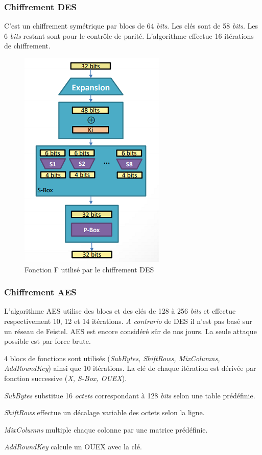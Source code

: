 \documentclass[12pt, a4paper]{article}
\begin{document}
	\subsubsection{Chiffrement DES}
	C'est un chiffrement symétrique par blocs de 64 \textit{bits}. Les clés sont
	de 58 \textit{bits}. Les 6 \textit{bits} restant sont pour le contrôle de
	parité. L'algorithme effectue 16 itérations de chiffrement.
	\begin{figure}[!ht]
		\centering
		\includegraphics{images/des}
		\caption{Fonction F utilisé par le chiffrement DES}
		\label{fig:des}
	\end{figure}
	\subsubsection{Chiffrement AES}
	L'algorithme AES utilise des blocs et des clés de 128 à 256 \textit{bits} et
	effectue respectivement 10, 12 et 14 itérations. \textit{A contrario} de DES
	il n'est pas basé sur un réseau de Feistel. AES est encore considéré sûr de
	nos jours. La seule attaque possible est par force brute.
	\par
	4 blocs de fonctions sont utilisés (\textit{SubBytes, ShiftRows, MixColumns,
	AddRoundKey}) ainsi que 10 itérations. La clé de chaque itération est dérivée
	par fonction successive (\textit{X, S-Box, OUEX}).
	\par
	\textit{SubBytes} substitue 16 \textit{octets} correspondant à 128
	\textit{bits} selon une table prédéfinie.
	\par
	\textit{ShiftRows} effectue un décalage variable des octets selon la ligne.
	\par
	\textit{MixColumns} multiple chaque colonne par une matrice prédéfinie.
	\par
	\textit{AddRoundKey} calcule un OUEX avec la clé.
\end{document}
